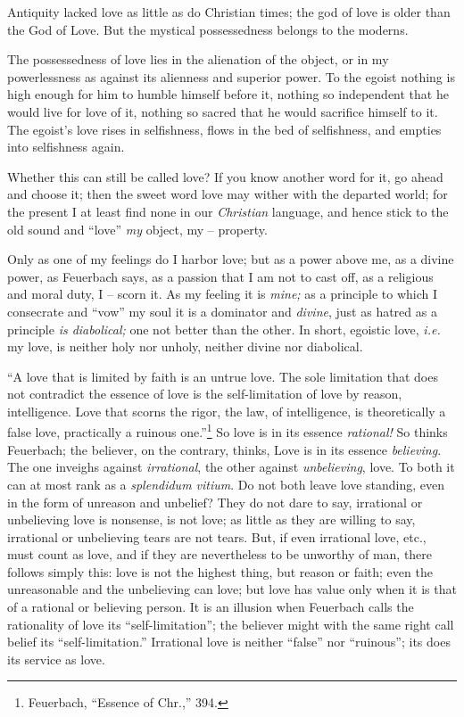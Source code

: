Antiquity lacked love as little as do Christian times; the god of love is 
older than the God of Love. But the mystical possessedness belongs to the 
moderns.

The possessedness of love lies in the alienation of the object, or in my 
powerlessness as against its alienness and superior power. To the egoist 
nothing is high enough for him to humble himself before it, nothing so 
independent that he would live for love of it, nothing so sacred that he would 
sacrifice himself to it. The egoist's love rises in selfishness, flows in the 
bed of selfishness, and empties into selfishness again.

Whether this can still be called love? If you know another word for it, go 
ahead and choose it; then the sweet word love may wither with the departed 
world; for the present I at least find none in our \textit{Christian} 
language, and hence stick to the old sound and ``love'' \textit{my} object, 
my -- property.

Only as one of my feelings do I harbor love; but as a power above me, as a 
divine power, as Feuerbach says, as a passion that I am not to cast off, as a 
religious and moral duty, I -- scorn it. As my feeling it is \textit{mine;} as 
a principle to which I consecrate and ``vow'' my soul it is a dominator and 
\textit{divine}, just as hatred as a principle \textit{is diabolical;} one not 
better than the other. In short, egoistic love, \textit{i.e.} my love, is 
neither holy nor unholy, neither divine nor diabolical.

``A love that is limited by faith is an untrue love. The sole limitation that 
does not contradict the essence of love is the self-limitation of love by 
reason, intelligence. Love that scorns the rigor, the law, of intelligence, is 
theoretically a false love, practically a ruinous one.''\footnote{Feuerbach, 
``Essence of Chr.,'' 394.} So love is in its essence \textit{rational!} So 
thinks Feuerbach; the believer, on the contrary, thinks, Love is in its 
essence \textit{believing}. The one inveighs against \textit{irrational}, the 
other against \textit{unbelieving}, love. To both it can at most rank as a 
\textit{splendidum vitium}. Do not both leave love standing, even in the form 
of unreason and unbelief? They do not dare to say, irrational or unbelieving 
love is nonsense, is not love; as little as they are willing to say, 
irrational or unbelieving tears are not tears. But, if even irrational love, 
etc., must count as love, and if they are nevertheless to be unworthy of man, 
there follows simply this: love is not the highest thing, but reason or faith; 
even the unreasonable and the unbelieving can love; but love has value only 
when it is that of a rational or believing person. It is an illusion when 
Feuerbach calls the rationality of love its ``self-limitation''; the 
believer might with the same right call belief its ``self-limitation.'' 
Irrational love is neither ``false'' nor ``ruinous''; its does its service 
as love.

